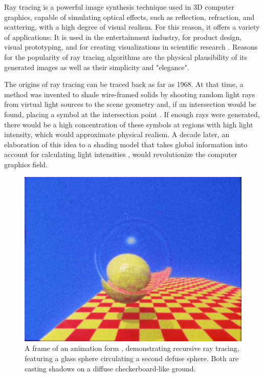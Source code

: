 \label{chap:intro}

Ray tracing is a powerful image synthesis technique used in 3D computer graphics, capable of simulating optical effects, such as reflection, refraction, and scattering, with a high degree of visual realism. For this reason, it offers a variety of applications: It is used in the entertainment industry, for product design, visual prototyping, and for creating visualizations in scientific research \cite [91-128]{peddie2019ray}. Reasons for the popularity of ray tracing algorithms are the physical plausibility of its generated images as well as their simplicity and "elegance". 

The origins of ray tracing can be traced back as far as 1968. At that time, a method was invented to shade wire-framed solids by shooting random light rays from virtual light sources to the scene geometry and, if an intersection would be found, placing a symbol at the intersection point \cite{appel1968some}. If enough rays were generated, there would be a high concentration of these symbols at regions with high light intensity, which would approximate physical realism. A decade later, an elaboration of this idea to a shading model that takes global information into account for calculating light intensities  \cite{whitted1979improved}, would revolutionize the computer graphics field.

\begin{figure} \label{fig:whitted_result}
	\centering
	\includegraphics[width=.7\linewidth]{img/0 introduction/whitted_}
	\caption{A frame of an animation \cite{raytracingvideo} form \cite {whitted1979improved}, demonstrating recursive ray tracing, featuring a glass sphere circulating a second defuse sphere. Both are casting shadows on a diffuse checkerboard-like ground.}
	\label{fig:g}
\end{figure}

